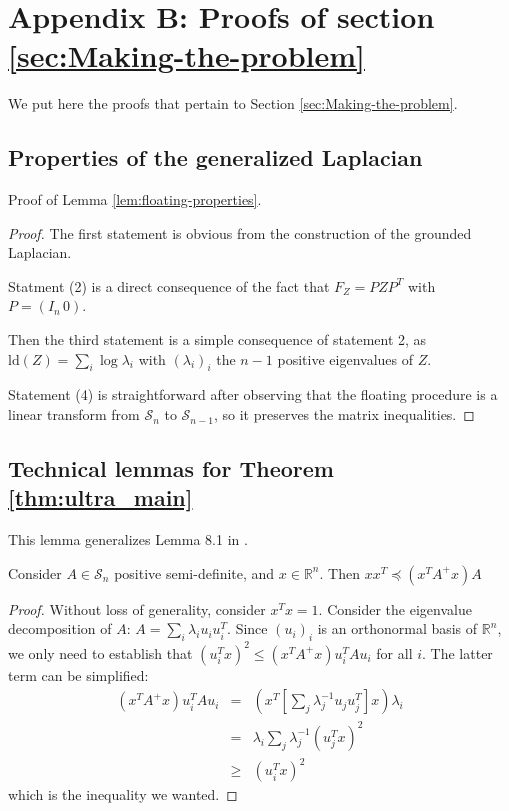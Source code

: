 
\section*{Appendix B: Proofs of section \ref{sec:Making-the-problem}}

We put here the proofs that pertain to Section \ref{sec:Making-the-problem}. 


\subsection{Properties of the generalized Laplacian}

Proof of Lemma \ref{lem:floating-properties}.

\begin{proof}The first statement is obvious from the construction
of the grounded Laplacian.

Statment (2) is a direct consequence of the fact that $F_{Z}=PZP^{T}$
with $P=\left(I_{n}\,0\right)$.

Then the third statement is a simple consequence of statement 2, as
$\text{ld}\left(Z\right)=\sum_{i}\log\lambda_{i}$ with $\left(\lambda_{i}\right)_{i}$
the $n-1$ positive eigenvalues of $Z$.

Statement (4) is straightforward after observing that the floating
procedure is a linear transform from $\mathcal{S}_{n}$ to $\mathcal{S}_{n-1}$,
so it preserves the matrix inequalities.

\end{proof}


\subsection{Technical lemmas for Theorem \ref{thm:ultra_main}}

This lemma generalizes Lemma 8.1 in \cite{Spielman2009a}.

\begin{lemma}\label{lem:simple-inequality}Consider $A\in\mathcal{S}_{n}$
positive semi-definite, and $x\in\mathbb{R}^{n}$. Then $xx^{T}\preceq\left(x^{T}A^{+}x\right)A$

\end{lemma}

\begin{proof}Without loss of generality, consider $x^{T}x=1$. Consider
the eigenvalue decomposition of $A$: $A=\sum_{i}\lambda_{i}u_{i}u_{i}^{T}$.
Since $\left(u_{i}\right)_{i}$ is an orthonormal basis of $\mathbb{R}^{n}$,
we only need to establish that $\left(u_{i}^{T}x\right)^{2}\leq\left(x^{T}A^{+}x\right)u_{i}^{T}Au_{i}$
for all $i$. The latter term can be simplified:
\begin{eqnarray*}
\left(x^{T}A^{+}x\right)u_{i}^{T}Au_{i} & = & \left(x^{T}\left[\sum_{j}\lambda_{j}^{-1}u_{j}u_{j}^{T}\right]x\right)\lambda_{i}\\
 & = & \lambda_{i}\sum_{j}\lambda_{j}^{-1}\left(u_{j}^{T}x\right)^{2}\\
 & \geq & \left(u_{i}^{T}x\right)^{2}
\end{eqnarray*}
which is the inequality we wanted.

\end{proof}

